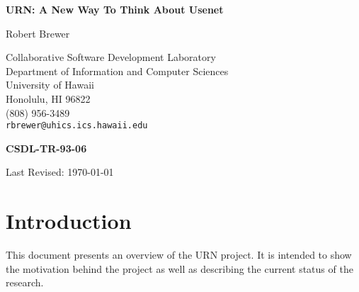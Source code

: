 



\vspace*{1in}

\begin{center}
{\Large\bf URN: A New Way To Think About Usenet} \bigskip\par


Robert Brewer                    \bigskip\par

Collaborative Software Development Laboratory\\
Department of Information and Computer Sciences\\
University of Hawaii\\
Honolulu, HI 96822\\
(808) 956-3489\\
{\tt rbrewer@uhics.ics.hawaii.edu}           \bigskip\par

{\bf CSDL-TR-93-06}                \bigskip\par

Last Revised: \today

\end{center}

\newpage
\tableofcontents
\newpage


\section{Introduction}

This document presents an overview of the URN project. It is intended
to show the motivation behind the project as well as describing the
current status of the research.

